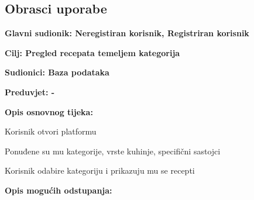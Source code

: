 \eject



\subsection{Obrasci uporabe}


\noindent {}
\begin{packed_item}

	\item \textbf{Glavni sudionik: Neregistiran korisnik, Registriran korisnik}
	\item  \textbf{Cilj: Pregled recepata temeljem kategorija}
	\item  \textbf{Sudionici: Baza podataka}
	\item  \textbf{Preduvjet: -}
	\item  \textbf{Opis osnovnog tijeka:}

	\item[] \begin{packed_enum}

		\item Korisnik otvori platformu
		\item Ponuđene su mu kategorije, vrste kuhinje, specifični sastojci
		\item Korisnik odabire kategoriju i prikazuju mu se recepti
	\end{packed_enum}

	\item  \textbf{Opis mogućih odstupanja:}

	\item[] \begin{packed_item}

		\item[2.a]
		\item[] \begin{packed_enum}

			\item
			\item

		\end{packed_enum}
		\item[2.b]
		\item[3.a]

	\end{packed_item}
\end{packed_item}


